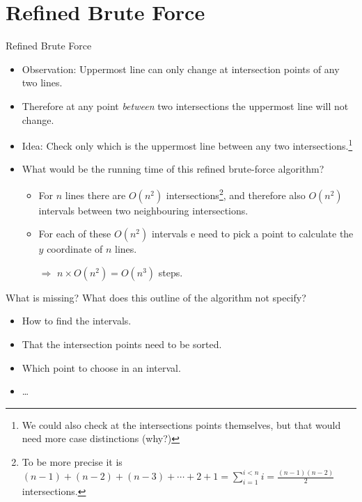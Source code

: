 \documentclass[ignorenonframetext,]{beamer}
\begin{document}
\section{Refined Brute Force}
\begin{frame}{Refined Brute Force}

\begin{itemize}[<+->]
    \item Observation: Uppermost line can only change at intersection points of any two lines.
    \item Therefore at any point \emph{between} two intersections the uppermost line will not change.
    \item Idea: Check only which is the uppermost line between any two intersections.\footnote{We could also check at the intersections points themselves, but that would need more case distinctions (why?)}
    \item What would be the running time of this refined brute-force algorithm?
        \begin{itemize}
            \item For $n$ lines there are $O(n^2)$ intersections\footnote{To be more precise it is $ (n-1) + (n-2) + (n-3) + \cdots + 2 + 1 = \sum_{i = 1}^{i < n} i = \frac{(n-1)(n-2)}{2}$ intersections.}, and therefore also $O(n^2)$ intervals between two neighbouring intersections.
            \item For each of these $O(n^2)$ intervals e need to pick a point to calculate the $y$ coordinate of $n$ lines.
            \item[$\Rightarrow$] $n \times O(n^2) = O(n^3)$ steps.
        \end{itemize}
        \end{itemize}
\end{frame}

\begin{frame}{What is missing?}
    What does this outline of the algorithm not specify?
    \begin{itemize}
        \item How to find the intervals.
        \item That the intersection points need to be sorted.
        \item Which point to choose in an interval.
        \item \dots
    \end{itemize}
\end{frame}
\end{document}
